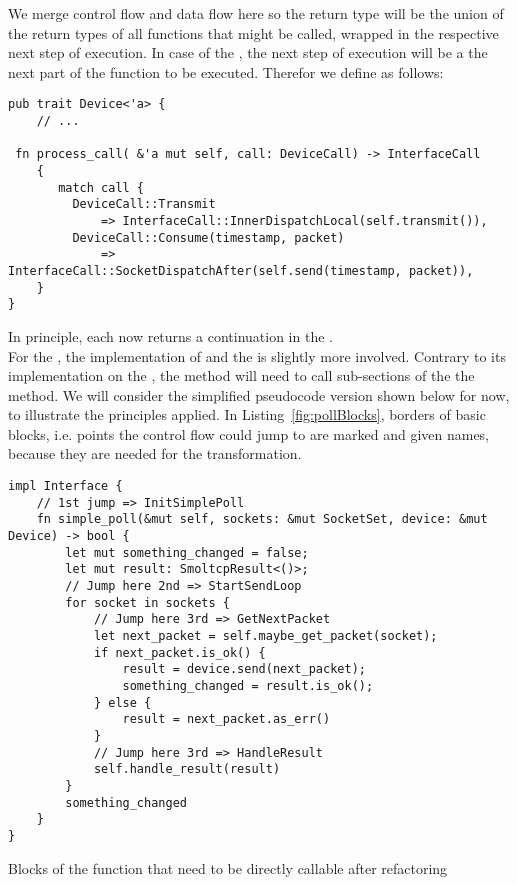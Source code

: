 We merge control flow and data flow here so the return type will be the union of the return types of all functions that might be called, wrapped in the respective next step of execution. In case of the \dev{}, the next step of execution will be a the next part of the  function to be executed. Therefor we define  as follows:
\begin{verbatim}
pub trait Device<'a> {
    // ...
    
 fn process_call( &'a mut self, call: DeviceCall) -> InterfaceCall
    {
       match call {
         DeviceCall::Transmit
             => InterfaceCall::InnerDispatchLocal(self.transmit()),
         DeviceCall::Consume(timestamp, packet)
             => InterfaceCall::SocketDispatchAfter(self.send(timestamp, packet)),
    }
}
\end{verbatim}

In principle, each  now returns a continuation in the \stack{}.\\

For the \stack{}, the implementation of  and the  is slightly more involved. Contrary to its implementation on the \dev{}, the  method will need to call sub-sections of the the  method. We will consider the simplified pseudocode version shown below for now, to illustrate the principles applied. In Listing~\ref{fig:pollBlocks}, borders of basic blocks, i.e. points the control flow could jump to are marked and given names, because they are needed for the transformation. 
\begin{codefigure}
    
\begin{verbatim}
impl Interface {
    // 1st jump => InitSimplePoll
    fn simple_poll(&mut self, sockets: &mut SocketSet, device: &mut Device) -> bool {
        let mut something_changed = false;
        let mut result: SmoltcpResult<()>;
        // Jump here 2nd => StartSendLoop
        for socket in sockets {
            // Jump here 3rd => GetNextPacket
            let next_packet = self.maybe_get_packet(socket);
            if next_packet.is_ok() {
                result = device.send(next_packet);
                something_changed = result.is_ok();
            } else {
                result = next_packet.as_err()
            }
            // Jump here 3rd => HandleResult
            self.handle_result(result)
        }
        something_changed
    }
}
\end{verbatim}
\caption{Blocks of the  function that need to be directly callable after refactoring}
\label{fig:pollBlocks}
\end{codefigure}

